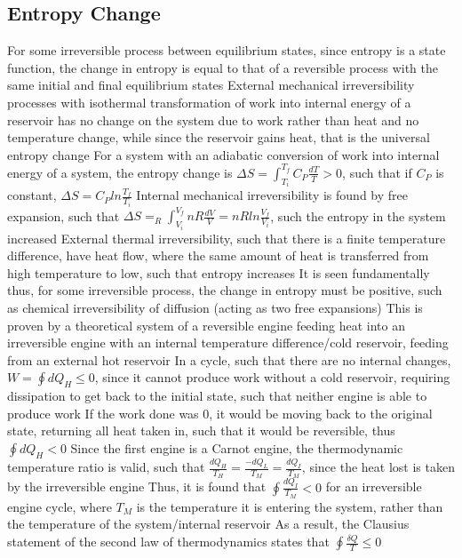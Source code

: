 \documentclass[11 pt, twoside]{article}
\newenvironment{outline*}
{
	\begin{outline}[enumerate]
	}
	{\end{outline}
}
\begin{document}
\subsection{Entropy Change}
\begin{outline*}
\1 For some irreversible process between equilibrium states, since entropy is a state function, the change in entropy is equal to that of a reversible process with the same initial and final equilibrium states
\2 External mechanical irreversibility processes with isothermal transformation of work into internal energy of a reservoir has no change on the system due to work rather than heat and no temperature change, while since the reservoir gains heat, that is the universal entropy change
\3 For a system with an adiabatic conversion of work into internal energy of a system, the entropy change is $\Delta S = \int^{T_f}_{T_i} C_P \frac{dT}{T} > 0$, such that if $C_P$ is constant, $\Delta S = C_P ln\frac{T_f}{T_i}$
\2 Internal mechanical irreversibility is found by free expansion, such that $\Delta S = _R\int_{V_i}^{V_f} nR \frac{dV}{V} = nR ln\frac{V_f}{V_i}$, such the entropy in the system increased
\2 External thermal irreversibility, such that there is a finite temperature difference, have heat flow, where the same amount of heat is transferred from high temperature to low, such that entropy increases
\2 It is seen fundamentally thus, for some irreversible process, the change in entropy must be positive, such as chemical irreversibility of diffusion (acting as two free expansions)
\2 This is proven by a theoretical system of a reversible engine feeding heat into an irreversible engine with an internal temperature difference/cold reservoir, feeding from an external hot reservoir
\3 In a cycle, such that there are no internal changes, $W = \oint dQ_{H} \leq 0$, since it cannot produce work without a cold reservoir, requiring dissipation to get back to the initial state, such that neither engine is able to produce work
\3 If the work done was 0, it would be moving back to the original state, returning all heat taken in, such that it would be reversible, thus $\oint dQ_H < 0$
\3 Since the first engine is a Carnot engine, the thermodynamic temperature ratio is valid, such that $\frac{dQ_H}{T_H} = \frac{-dQ_L}{T_M} = \frac{dQ_I}{T_M}$, since the heat lost is taken by the irreversible engine
\3 Thus, it is found that $\oint \frac{dQ_I}{T_M} < 0$ for an irreversible engine cycle, where $T_M$ is the temperature it is entering the system, rather than the temperature of the system/internal reservoir
\2 As a result, the Clausius statement of the second law of thermodynamics states that $\oint \frac{\delta Q}{T} \leq 0$

\end{outline*}
\end{document}
